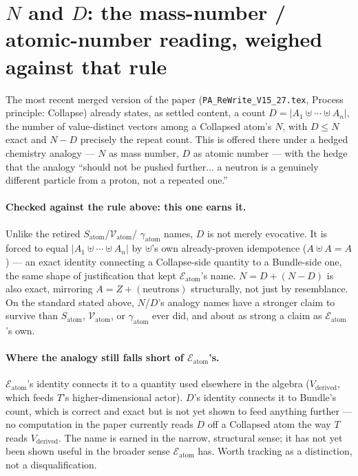 \documentclass[11pt]{article}
\begin{document}
\section{$N$ and $D$: the mass-number / atomic-number reading,
weighed against that rule}

The most recent merged version of the paper
(\texttt{PA\_ReWrite\_V15\_27.tex}, Process principle: Collapse)
already states, as settled content, a count $D=\lvert
A_1\uplus\cdots\uplus A_n\rvert$, the number of value-distinct
vectors among a Collapsed atom's $N$, with $D\le N$ exact and
$N-D$ precisely the repeat count. This is offered there under a
hedged chemistry analogy --- $N$ as mass number, $D$ as atomic
number --- with the hedge that the analogy ``should not be pushed
further... a neutron is a genuinely different particle from a
proton, not a repeated one.''

\paragraph{Checked against the rule above: this one earns it.}
Unlike the retired $S_{\text{atom}}$/$\mathcal{V}_{\text{atom}}$/
$\gamma_{\text{atom}}$ names, $D$ is not merely evocative. It is
forced to equal $\lvert A_1\uplus\cdots\uplus A_n\rvert$ by $\uplus$'s
own already-proven idempotence ($A\uplus A=A$) --- an exact identity
connecting a Collapse-side quantity to a Bundle-side one, the same
shape of justification that kept $\mathcal{E}_{\text{atom}}$'s name.
$N=D+(N-D)$ is also exact, mirroring $A=Z+(\text{neutrons})$
structurally, not just by resemblance. On the standard stated above,
$N$/$D$'s analogy names have a stronger claim to survive than
$S_{\text{atom}}$, $\mathcal{V}_{\text{atom}}$, or $\gamma_{\text{atom}}$
ever did, and about as strong a claim as $\mathcal{E}_{\text{atom}}$'s
own.

\paragraph{Where the analogy still falls short of $\mathcal{E}_{\text{atom}}$'s.}
$\mathcal{E}_{\text{atom}}$'s identity connects it to a quantity used
elsewhere in the algebra ($V_{\text{derived}}$, which feeds $T$'s
higher-dimensional actor). $D$'s identity connects it to Bundle's
count, which is correct and exact but is not yet shown to feed
anything further --- no computation in the paper currently reads $D$
off a Collapsed atom the way $T$ reads $V_{\text{derived}}$. The
name is earned in the narrow, structural sense; it has not yet been
shown useful in the broader sense $\mathcal{E}_{\text{atom}}$ has.
Worth tracking as a distinction, not a disqualification.
\end{document}
